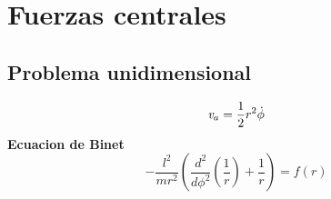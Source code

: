 \documentclass[../main.tex]{subfiles}
\begin{document}
\chapter{Fuerzas centrales}

\section{Problema unidimensional}

\begin{equation}
    \emph{v}_a=\frac{1}{2}r^2\dot{\phi}
\end{equation}
\textbf{Ecuacion de Binet}
\begin{equation} \label{eq:binet}
    -\frac{l^2}{mr^2} \left( \frac{d^2}{d \phi^2}\left( \frac{1}{r}\right)+\frac{1}{r} \right)=f(r)
\end{equation}
\end{document}
